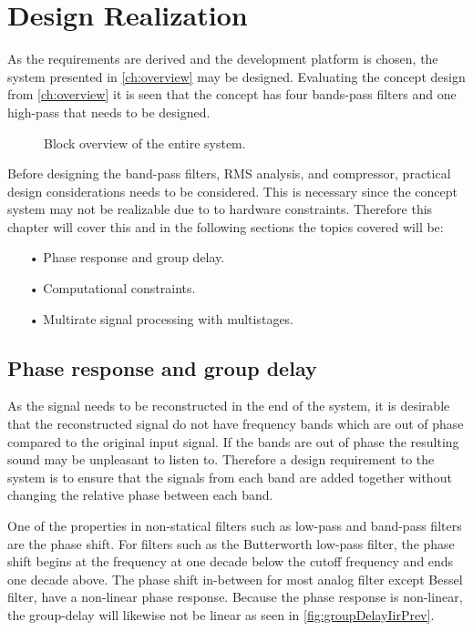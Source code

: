 \chapter{Design Realization} \label{ch:designRealization}
As the requirements are derived and the development platform is chosen, the system presented in \autoref{ch:overview} may be designed. Evaluating the concept design from \autoref{ch:overview} it is seen that the concept has four bands-pass filters and one high-pass that needs to be designed. 
\begin{figure}[H]
\centering
{}
\scalebox{0.8}{
}
\caption{Block overview of the entire system.}
\label{fig:SystemOverview2}
\end{figure}
Before designing the band-pass filters, RMS analysis, and compressor, practical design considerations needs to be considered. This is necessary since the concept system may not be realizable due to to hardware constraints. Therefore this chapter will cover this and in the following sections the topics covered will be:
\begin{itemize}
\item[•] Phase response and group delay.
\item[•] Computational constraints.
\item[•] Multirate signal processing with multistages.
\end{itemize}


\section{Phase response and group delay}
As the signal needs to be reconstructed in the end of the system, it is desirable that the reconstructed signal do not have frequency bands which are out of phase compared to the original input signal. If the bands are out of phase the resulting sound may be unpleasant to listen to. Therefore a design requirement to the system is to ensure that the signals from each band are added together without changing the relative phase between each band.

One of the properties in non-statical filters such as low-pass and band-pass filters are the phase shift. For filters such as the Butterworth low-pass filter, the phase shift begins at the frequency at one decade below the cutoff frequency and ends one decade above. The phase shift in-between for most analog filter except Bessel filter, have a non-linear phase response. Because the phase response is non-linear, the group-delay will likewise not be linear as seen in \autoref{fig:groupDelayIirPrev}.

